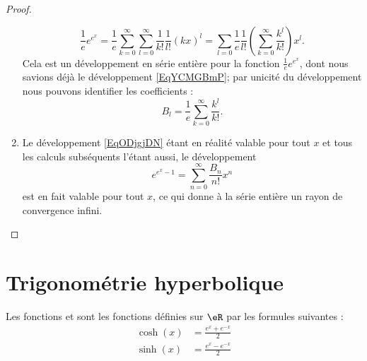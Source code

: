 \begin{proof}
\begin{enumerate}
                    \begin{equation}
                        \frac{1}{ e }e^{e^x}=\frac{1}{ e }\sum_{k=0}^{\infty}\sum_{l=0}^{\infty}\frac{1}{ k! }\frac{1}{ l! }(kx)^l=\sum_{l=0}\frac{1}{ e }\frac{1}{ l! }\left( \sum_{k=0}^{\infty}\frac{ k^l }{ k! } \right)x^l.
                    \end{equation}
                    Cela est un développement en série entière pour la fonction \( \frac{1}{ e } e^{e^x}\), dont nous savions déjà le développement \eqref{EqYCMGBmP}; par unicité du développement nous pouvons identifier les coefficients :
                    \begin{equation}
                        B_l=\frac{1}{ e }\sum_{k=0}^{\infty}\frac{ k^l }{ k! }.
                    \end{equation}
                    
                \item

                    Le développement \eqref{EqODjgjDN} étant en réalité valable pour tout \( x\) et tous les calculs subséquents l'étant aussi, le développement
                    \begin{equation}
                        e^{e^x-1}=\sum_{n=0}^{\infty}\frac{ B_n }{ n! }x^n
                    \end{equation}
                    est en fait valable pour tout \( x\), ce qui donne à la série entière un rayon de convergence infini.
    \end{enumerate}
\end{proof}

\section{Trigonométrie hyperbolique}

\begin{definition}
    Les fonctions  et  sont les fonctions définies sur $\eR$ par les formules suivantes :
    \begin{subequations}
        \begin{align}
            \cosh(x)&=\frac{  e^{x}+ e^{-x} }{2}\\
            \sinh(x)&=\frac{  e^{x}- e^{-x} }{2}
        \end{align}
    \end{subequations}
\end{definition}

